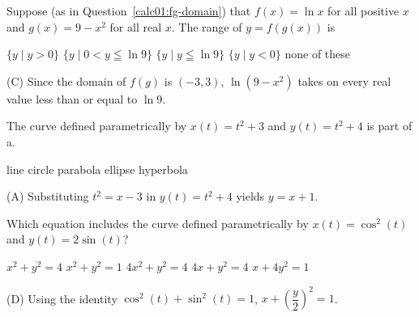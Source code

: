 \newpage



\question
Suppose (as in Question~\ref{calc01:fg-domain}) that $f(x)=\ln x$ for all positive $x$ and $g(x)=9-x^{2}$ for all real $x$. The range of $y=f(g(x))$ is
\begin{choices}
  \choice $\{y \mid y>0\}$
  \choice $\{y \mid 0<y \leqq \ln 9\}$
  \CorrectChoice $\{y \mid y \leqq \ln 9\}$
  \choice $\{y \mid y<0\}$
  \choice none of these
\end{choices}
\begin{solution}
(C) Since the domain of $f(g)$ is $(-3,3)$, $\ln \left(9-x^{2}\right)$ takes on every real value less than or equal to $\ln 9$.
\end{solution}

\question
The curve defined parametrically by $x(t)=t^{2}+3$ and $y(t)=t^{2}+4$ is part of a.
\begin{choices}
  \CorrectChoice line
  \choice circle
  \choice parabola
  \choice ellipse
  \choice hyperbola
\end{choices}
\begin{solution}
(A) Substituting $t^{2}=x-3$ in $y(t)=t^{2}+4$ yields $y=x+1$.
\end{solution}

\question
Which equation includes the curve defined parametrically by $x(t)=\cos ^{2}(t)$ and $y(t)=2 \sin (t)$?
\begin{choices}
  \choice $x^{2}+y^{2}=4$
  \choice $x^{2}+y^{2}=1$
  \choice $4 x^{2}+y^{2}=4$
  \CorrectChoice $4 x+y^{2}=4$
  \choice $x+4 y^{2}=1$
\end{choices}
\begin{solution}
(D) Using the identity $\cos ^{2}(t)+\sin ^{2}(t)=1$, $x+\left(\dfrac{y}{2}\right)^{2}=1$.
\end{solution}
